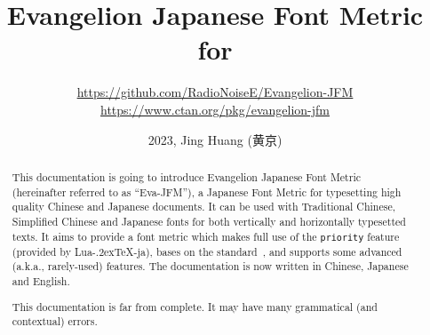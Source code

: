 \documentclass[twoside]{article}
\title{\sffamily\bfseries Evangelion Japanese Font Metric for \LuaTeX}
\author{\large \url{https://github.com/RadioNoiseE/Evangelion-JFM}\\\url{https://www.ctan.org/pkg/evangelion-jfm}}
\date{2023, Jing Huang (黄京)}
\def\LuaTeX{Lua\kern-.2ex\TeX}
\begin{document}
\parindent=12pt\parskip=2pt
\maketitle

\begin{abstract}
    This documentation is going to introduce Evangelion Japanese Font Metric (hereinafter referred to as ``\textsf{Eva-JFM}''), a Japanese Font Metric for typesetting high quality Chinese and Japanese documents. It can be used with Traditional Chinese, Simplified Chinese and Japanese fonts for both vertically and horizontally typesetted texts. It aims to provide a font metric which makes full use of the \texttt{priority} feature (provided by \textsf{\LuaTeX-ja}), bases on the standard~\cite{jlreq}, and supports some advanced (a.k.a., rarely-used) features. The documentation is now written in Chinese, Japanese and English.\par
    This documentation is far from complete. It may have many grammatical (and contextual) errors.
\end{abstract}

\tableofcontents
\end{document}
